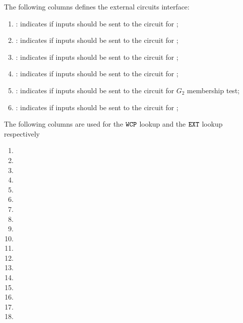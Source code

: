 The following columns defines the external circuits interface:
\begin{enumerate}[resume]
    \item \both{\csEcrecover}: indicates if inputs should be sent to the circuit for \instEcrecover{};
    \item \both{\csEcadd}: indicates if inputs should be sent to the circuit for \instEcadd{};
    \item \both{\csEcmul}: indicates if inputs should be sent to the circuit for \instEcmul{};
    \item \both{\csEcpairing}: indicates if inputs should be sent to the circuit for \instEcpairing{};
    \item \both{\csGTwo}: indicates if inputs should be sent to the circuit for $G_2$ membership test;
    \item \both{\csPVerify}: indicates if inputs should be sent to the circuit for \instPVerify{};
\end{enumerate}
The following columns are used for the $\texttt{WCP}$ lookup and the $\texttt{EXT}$ lookup respectively
\begin{multicols}{2}
      \begin{enumerate}[resume]
            \item \wcpFlag
            \item \wcpArgOneHi
            \item \wcpArgOneLo
            \item \wcpArgTwoHi
            \item \wcpArgTwoLo
            \item \wcpRes
            \item \wcpInst
            \item \extFlag
            \item \extArgOneHi
            \item \extArgOneLo
            \item \extArgTwoHi
            \item \extArgTwoLo
            \item \extArgThreeHi
            \item \extArgThreeLo
            \item \extResHi
            \item \extResLo
            \item \extInst
            \item[\vspace{\fill}]
      \end{enumerate}
\end{multicols}
